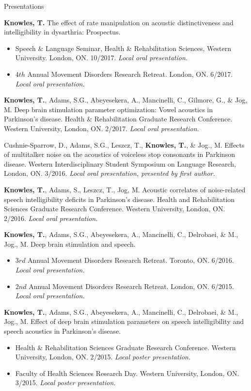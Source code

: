 \documentclass{resume} %
\begin{document}
\begin{rSection}{Presentations}
\begin{etaremune}
\item {\bf Knowles, T.} The effect of rate manipulation on acoustic distinctiveness and intelligibility in dysarthria: Prospectus. 
	\begin{itemize}
		\renewcommand\labelitemi{$\cdot$}
		\item Speech \& Language Seminar, Health \& Rehabilitation Sciences, Western University. London, ON. 10/2017. \emph{Local oral presentation.}
		\item $4th$ Annual Movement Disorders Research Retreat. London, ON. 6/2017. \emph{Local oral presentation.}
	\end{itemize}
	
	
\item {\bf Knowles, T.}, Adams, S.G., Abeyesekera, A., Mancinelli, C., Gilmore, G., \& Jog, M. Deep brain stimulation parameter optimization: Vowel acoustics in Parkinson's disease. Health \& Rehabilitation Graduate Research Conference. Western University, London, ON. 2/2017. \emph{Local oral presentation.}

	Cushnie-Sparrow, D., Adams, S.G., Leszcz, T., {\bf Knowles, T.},  \& Jog., M. Effects of multitalker noise on the acoustics of voiceless stop consonants in Parkinson disease. Western Interdisciplinary Student Symposium on Language Research, London, ON. 3/2016. \emph{Local oral presentation, presented by first author.}

\item {\bf Knowles, T.}, Adams, S., Leszcz, T., Jog, M. Acoustic correlates of noise-related speech intelligibility deficits in Parkinson's disease. Health and Rehabilitation Sciences Graduate Research Conference. Western University, London, ON. 2/2016. \emph{Local oral presentation.}
	
\item {\bf Knowles, T.}, Adams, S.G., Abeyesekera, A., Mancinelli, C., Delrobaei, \& M., Jog., M. Deep brain stimulation and speech.
	\begin{itemize}
				\renewcommand\labelitemi{$\cdot$}
		\item $3rd$ Annual Movement Disorders Research Retreat. Toronto, ON. 6/2016.  \emph{Local oral presentation.}
		\item $2nd$ Annual Movement Disorders Research Retreat. London, ON. 6/2015.  \emph{Local oral presentation.}
	\end{itemize}
	
\item {\bf Knowles, T.}, Adams, S.G., Abeyesekera, A., Mancinelli, C., Delrobaei, \& M., Jog., M. Effect of deep brain stimulation parameters on speech intelligibility and speech acoustics in Parkinson's disease. 
	\begin{itemize}
				\renewcommand\labelitemi{$\cdot$}
		\item Health \& Rehabilitation Sciences Graduate Research Conference. Western University, London, ON.  2/2015.  \emph{Local poster presentation.}
		\item Faculty of Health Sciences Research Day. Western University, London, ON. 3/2015.  \emph{Local poster presentation.}
	\end{itemize}
	

\end{etaremune}
\end{rSection}
\end{document}

